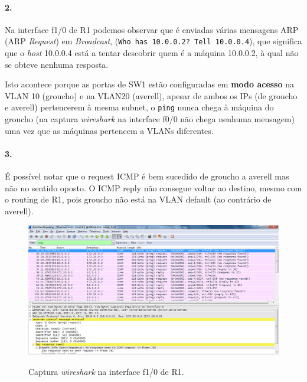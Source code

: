 

\paragraph{2.}
Na interface \textsf{f1/0} de \textsf{R1} podemos observar que é enviadas várias
mensagens ARP (ARP \emph{Request}) em \emph{Broadcast}, 
(\texttt{Who has 10.0.0.2? Tell 10.0.0.4}), que significa que o \emph{host} 
10.0.0.4 está a tentar descobrir quem é a máquina 10.0.0.2, à qual não se obteve
nenhuma resposta.

Isto acontece porque as portas de \textsf{SW1} estão configuradas em 
\textbf{modo acesso} na VLAN 10 (\textsf{groucho}) e na VLAN20  (\textsf{averell}), 
apesar de ambos os IPs (de \textsf{groucho} e \textsf{averell}) pertencerem à mesma subnet, o \texttt{ping} nunca chega à máquina do \textsf{groucho} (na captura 
\emph{wireshark} na interface \textsf{f0/0} não chega nenhuma mensagem) uma vez que 
as máquinas pertencem a VLANs diferentes.


\paragraph{3.}
É possível notar que o request ICMP é bem sucedido de groucho a averell mas não no sentido oposto. O ICMP reply não consegue voltar ao destino, mesmo com o routing de R1, pois groucho não está na VLAN default (ao contrário de averell).
 
 
\begin{figure}[h]
\centering
\includegraphics[width=1\textwidth, height=0.38\textheight]{3_interface10_R1.png}
\label{fig:4-capturaWireshark}
\caption{Captura \emph{wireshark} na interface \textsf{f1/0} de \textsf{R1}.}
\end{figure}


